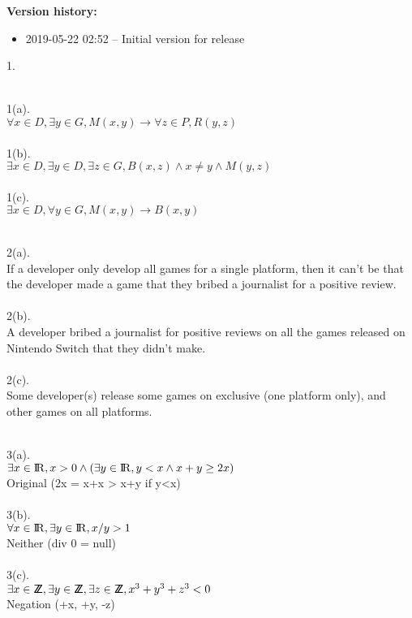 \documentclass[a4paper, 20pt,fleqn]{article}
\begin{document}
\textbf{Version history:}
\begin{itemize}
    \item 2019-05-22 02:52 -- Initial version for release
\end{itemize}

\newpage

\begin{question}{1.}

\newpage

\\1(a).
\\$ \forall x \in D,  \exists y \in G, M(x, y) \rightarrow \forall z \in P, R(y, z) $
\\
\\1(b).
\\$\exists x \in D, \exists y \in D, \exists z \in G,  B(x, z) \land x \ne y \land M(y, z) $
\\
\\1(c).
\\$ \exists x \in D, \forall y \in G, M(x, y) \rightarrow B(x, y) $
\newpage



\newpage

\\2(a).
\\If a developer only develop all games for a single platform, then it can't be that the developer made a game that they bribed a journalist for a positive review.
\\
\\2(b).
\\ A developer bribed a journalist for positive reviews on all the games released on Nintendo Switch that they didn't make.
\\
\\2(c).
\\Some developer(s) release some games on exclusive (one platform only), and other games on all platforms.
\\
\newpage



\newpage

\\3(a).
\\$\exists x \in \R, x > 0 \land (\exists y \in \R, y < x \land x + y \ge 2x) $
\\Original (2x = x+x > x+y if y<x)
\\
\\3(b).
\\$\forall x \in \R, \exists y \in \R, x/y > 1$
\\Neither (div 0 = null)
\\
\\3(c).
\\$\exists x\in\Z, \exists y\in\Z, \exists z\in\Z, x^3 + y^3 + z^3 < 0$
\\Negation (+x, +y, -z)
\\


\end{question}
\end{document}
